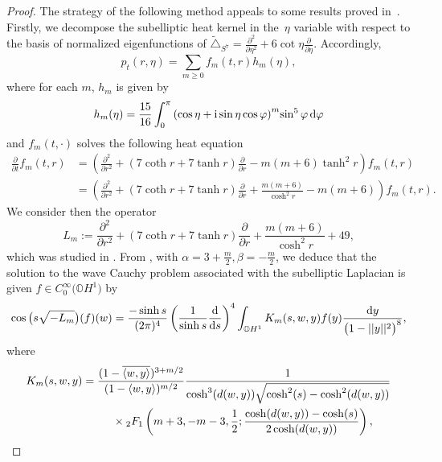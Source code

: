 \documentclass[pdftex]{sigma}
\numberwithin{equation}{section}
\begin{document}
\begin{proof}
The strategy of the following method appeals to some results proved in~\cite{AIMVOM97}. Firstly, we decompose the subelliptic heat kernel in the~$\eta$ variable with respect to the basis of normalized eigenfunctions of $\tilde{\triangle}_{S^7}=\frac{{\partial}^2}{\partial {\eta}^2}+6\cot \eta\frac{{\partial}}{\partial {\eta}}$.
Accordingly,
\begin{equation*}
p_t(r,\eta)=\sum_{m\geq 0} f_m(t,r)h_m(\eta),
\end{equation*}
where for each $m$, $h_m$ is given by
\begin{equation*}%
h_m(\eta)=\frac{15}{16}\int_{0}^{\pi}{(\cos \eta + {\rm i}\sin \eta \cos \varphi)}^m{\sin^5 \varphi}\, {\rm d} \varphi
\end{equation*}
and $f_m(t,\cdot)$ solves the following heat equation
\begin{align*}
\frac{\partial}{\partial t}f_m(t,r)& =\left( \frac{{\partial}^2}{\partial {r}^2}+(7\coth r+7\tanh r)\frac{{\partial}}{\partial {r}}-m(m+6){\tanh^2 r} \right) f_m(t,r) \\
&=\left( \frac{{\partial}^2}{\partial {r}^2}+(7\coth r+7\tanh r)\frac{{\partial}}{\partial {r}}+\frac{m(m+6)}{\cosh^2 r}-m(m+6) \right) f_m(t,r).
\end{align*}
We consider then the operator
\begin{equation*}
L_m:=\frac{{\partial}^2}{\partial {r}^2}+(7\coth r+7\tanh r)\frac{{\partial}}{\partial {r}}+\frac{m(m+6)}{\cosh^2 r}+49,
\end{equation*}
which was studied in \cite[p.~229]{AIMVOM97}.
From \cite[Theorem~2]{AIMVOM97}, with $\alpha=3+\frac{m}{2}, \beta=-\frac{m}{2}$, we deduce that the solution to the wave Cauchy problem associated with the subelliptic Laplacian is given $f\in C^{\infty}_{0}\big(\mathbb{O}H^1\big)$ by
\begin{equation*}
\cos \big(s\sqrt{-L_{m}}\big)(f)(w)=\frac{-\sinh s}{(2\pi)^{4}}\left(\frac{1}{\sinh s }\frac{{\rm d}}{{\rm d}s}\right)^{4}\int_{\mathbb{O}H^1}K_m(s,w,y)f(y)\frac{{\rm d}y}{\big(1-||y||^2\big)^{8}},
\end{equation*}
where
\begin{gather*}
K_m(s,w,y) =\frac{(1-\overline{\langle w,y\rangle})^{3+m/2}}{(1-\langle w,y\rangle)^{m/2}}\frac{1}{\cosh^3(d(w,y))\sqrt{\cosh^2(s)-\cosh^2(d(w,y))}} \\
\hphantom{K_m(s,w,y) =}{} \times {_2}F_{1}\left(m+3,-m-3,\frac{1}{2};\frac{\cosh(d(w,y))-\cosh(s)}{2\cosh(d(w,y)) }\right),
\end{gather*}

\end{proof}
\end{document}
